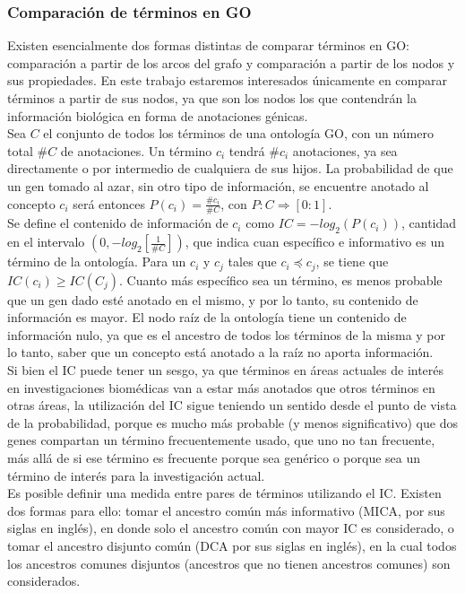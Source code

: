 \subsubsection{Comparación de términos en GO}
Existen esencialmente dos formas distintas de comparar términos en GO: comparación a partir de los arcos del grafo y comparación a partir de los nodos y sus propiedades. En este trabajo estaremos interesados únicamente en comparar términos a partir de sus nodos, ya que son los nodos los que contendrán la información biológica en forma de anotaciones génicas.\\
Sea $C$ el conjunto de todos los términos de una ontología GO, con un número total $\#C$ de anotaciones. Un término $c_i$ tendrá $\#c_i$ anotaciones, ya sea directamente o por intermedio de cualquiera de sus hijos. La probabilidad de que un gen tomado al azar, sin otro tipo de información, se encuentre anotado al concepto $c_i$ será entonces $P(c_i) = \frac{\#c_i}{\#C}$, con $P:C\Rightarrow [0:1]$.\\
Se define el contenido de información de $c_i$ como $IC = -log_2(P(c_i))$, cantidad en el intervalo $(0, -log_2[\frac{1}{\#C}])$, que indica cuan específico e informativo es un término de la ontología. Para un $c_i$ y $c_j$ tales que $c_i \preceq c_j$, se tiene que $IC(c_i) \geq IC(C_j)$. Cuanto más específico sea un término, es menos probable que un gen dado esté anotado en el mismo, y por lo tanto, su contenido de información es mayor. El nodo raíz de la ontología tiene un contenido de información nulo, ya que es el ancestro de todos los términos de la misma y por lo tanto, saber que un concepto está anotado a la raíz no aporta información.\\
Si bien el IC puede tener un sesgo, ya que términos en áreas actuales de interés en investigaciones biomédicas van a estar más anotados que otros términos en otras áreas, la utilización del IC sigue teniendo un sentido desde el punto de vista de la probabilidad, porque es mucho más probable (y menos significativo) que dos genes compartan un término frecuentemente usado, que uno no tan frecuente, más allá de si ese término es frecuente porque sea genérico o porque sea un término de interés para la investigación actual.\\
Es posible definir una medida entre pares de términos utilizando el IC. Existen dos formas para ello: tomar el ancestro común más informativo (MICA, por sus siglas en inglés), en donde solo el ancestro común con mayor IC es considerado, o tomar el ancestro disjunto común (DCA por sus siglas en inglés), en la cual todos los ancestros comunes disjuntos (ancestros que no tienen ancestros comunes) son considerados.\\
